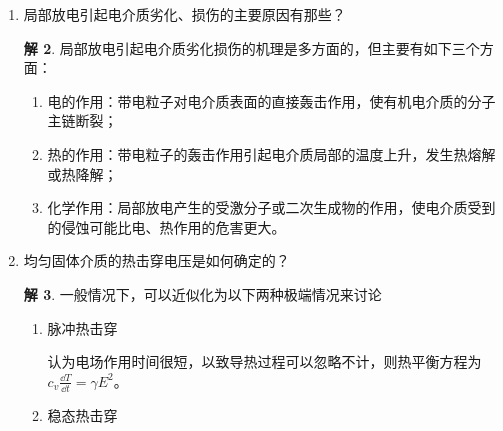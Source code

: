 \documentclass[zihao=-4,fontset = none]{ctexart}
\theoremstyle{definition}
\newtheorem*{solution}{解}
\begin{document}
\begin{enumerate}
\begin{solution}
\begin{enumerate}
      由于湿空气中的水分子被吸附于介质的表面，形成一层很薄的水膜。因为水本身为半导体（$\rho_v=\SI{e5}{\ohm m}$），所以介质表面的水膜将引起较大的表面电流，使 $\gamma_s$ 增加。
      \item 电介质的分子结构对表面电导率的影响
      
      电介质按水在介质表面分布状态的不同，可分为亲水电介质和疏水电介质两大类。
      \begin{enumerate}
        \item 亲水电介质：这种介质表面所吸附的水易于形成连续水膜，故表面电导率大，特别是一些含有碱金属离子的介质，介质中的碱金属离子还会进入水膜，降低水的电阻率，使表面电导率进一步上升，甚至丧失其绝缘性能。
        \item 疏水电介质：这些介质分子为非极性分子所组成，它们对水的吸引力小于水分子的内聚力，所以吸附在这类介质表面的水往往成为孤立的水滴，其接触角 $θ>90^\circ$，不能形成连续的水膜，故 $\gamma_s$ 很小，且大气湿度的影响较小。
      \end{enumerate}
      \item 电介质表面清洁度对表面电导率的影响
      
      表面沾污特别是含有电解质的沾污，将会引起介质表面导电水膜的电阻率下降，从而使 $\gamma_s$ 升高。
    \end{enumerate}
  \end{solution}
  \item 局部放电引起电介质劣化、损伤的主要原因有那些？
  \begin{solution}
    局部放电引起电介质劣化损伤的机理是多方面的，但主要有如下三个方面：
    \begin{enumerate}
      \item 电的作用：带电粒子对电介质表面的直接轰击作用，使有机电介质的分子主链断裂；
      \item 热的作用：带电粒子的轰击作用引起电介质局部的温度上升，发生热熔解或热降解；
      \item 化学作用：局部放电产生的受激分子或二次生成物的作用，使电介质受到的侵蚀可能比电、热作用的危害更大。
    \end{enumerate}
  \end{solution}
  \item 均匀固体介质的热击穿电压是如何确定的？
  \begin{solution}
    一般情况下，可以近似化为以下两种极端情况来讨论
    \begin{enumerate}
      \item 脉冲热击穿
      
      认为电场作用时间很短，以致导热过程可以忽略不计，则热平衡方程为
      \( c_v \frac{\dd{T}}{\dd{t}} = \gamma E^2 \)。
      \item 稳态热击穿
      

\end{enumerate}
\end{solution}
\end{enumerate}
\end{document}
